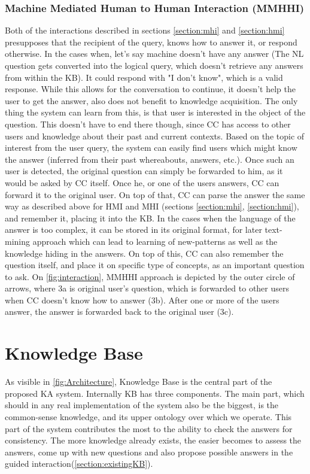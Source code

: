\subsubsection{Machine Mediated Human to Human Interaction (MMHHI)}
\label{section:mmhhi}
Both of the interactions described in sections \ref{section:mhi} and 
\ref{section:hmi} presupposes that the recipient of the query, knows how to
answer it, or respond otherwise. In the cases when, let's say machine doesn't
have any answer (The NL question gets converted into the logical query, which 
doesn't retrieve any answers from within the KB). It could respond with 
"I don't know", which is a valid response.
While this allows for the conversation to continue, it doesn't help the user
to get the answer, also does not benefit to knowledge acquisition. The only 
thing the system can learn from this, is that user is interested in the object
of the question. This doesn't have to end there though, since CC has access to
other users and knowledge about their past and current contexts. Based on the
topic of interest from the user query, the system can easily find users which
might know the answer (inferred from their past whereabouts, answers, etc.).
Once such an user is detected, the original question can simply be forwarded to
him, as it would be asked by CC itself. Once he, or one of the users answers,
CC can forward it to the original user. On top of that, CC can parse the answer
the same way as described above for HMI and MHI (sections \ref{section:mhi},
\ref{section:hmi}), and remember it, placing it into the KB. In the cases when
the language of the answer is too complex, it can be stored in its original
format, for later text-mining approach which can lead to learning of new-patterns
as well as the knowledge hiding in the answers. On top of this, CC can also
remember the question itself, and place it on specific type of concepts, as an
important question to ask. On \autoref{fig:interaction},
MMHHI approach is depicted by the outer circle of arrows, where 3a is original 
user's question, which is forwarded to other users when CC doesn't know how to 
answer (3b). After one or more of the users answer, the answer is forwarded back
to the original user (3c).

\section{Knowledge Base}
\label{section:kb}
As visible in \autoref{fig:Architecture}, Knowledge Base is the central part
of the proposed KA system. Internally KB has three components. The main part, 
which should in any real implementation of the system also be the biggest, is 
the common-sense knowledge, and its upper ontology over which we operate. 
This part of the system contributes the most to the ability to check the 
answers for consistency. The more knowledge already exists, the easier becomes 
to assess the answers, come up with new questions and also propose possible
answers in the guided interaction(\autoref{section:existingKB}).

